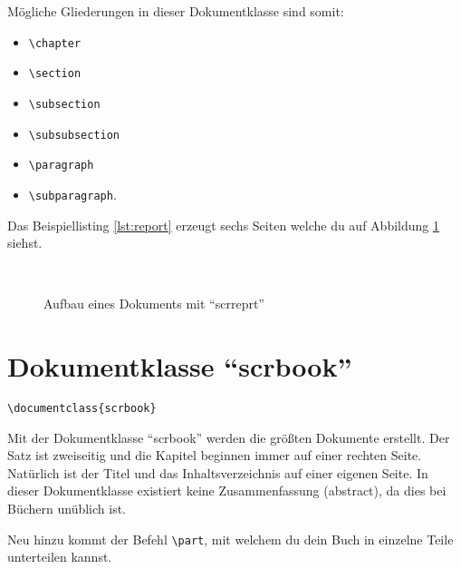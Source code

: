 Mögliche Gliederungen in dieser Dokumentklasse sind somit:

\begin{itemize}
	\item \texttt{\textbackslash chapter}
	\item \texttt{\textbackslash section}
	\item \texttt{\textbackslash subsection}
	\item \texttt{\textbackslash subsubsection}
	\item \texttt{\textbackslash paragraph}
	\item \texttt{\textbackslash subparagraph}.
\end{itemize}

Das Beispiellisting \ref{lst:report} erzeugt sechs Seiten welche du auf Abbildung \ref{fig:report} siehst.

\begin{figure}[htb]
	\begin{center}
		 \\
	\end{center}
	\caption{Aufbau eines Dokuments mit \enquote{scrreprt}}
	\label{fig:report}
\end{figure}


\section{Dokumentklasse \enquote{scrbook}}

\begin{lstlisting}
\documentclass{scrbook}
\end{lstlisting}

Mit der Dokumentklasse \enquote{scrbook} werden die größten Dokumente erstellt. Der Satz ist zweiseitig und die Kapitel beginnen immer auf einer rechten Seite. Natürlich ist der Titel und das Inhaltsverzeichnis auf einer eigenen Seite. In dieser Dokumentklasse existiert keine Zusammenfassung (abstract), da dies bei Büchern unüblich ist. 

Neu hinzu kommt der Befehl \texttt{\textbackslash part}, mit welchem du dein Buch in einzelne Teile unterteilen kannst.

